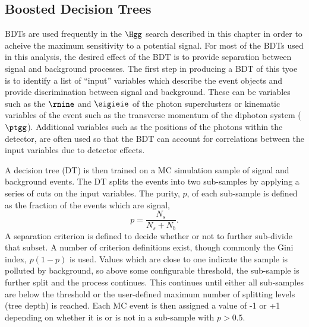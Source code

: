 \subsection{Boosted Decision Trees}
\label{sec:bdts}

BDTs are used frequently in the $\Hgg$ search described in this
chapter in order to acheive the maximum sensitivity to a potential signal.
For most of the BDTs used in this analysis, the desired effect
of the BDT is to provide separation between signal and background processes. 
The first step in producing a BDT of this tyoe is to identify a list of ``input'' 
variables which describe the event objects and provide discrimination 
between signal and background.  
These can be variables such as the $\rnine$ and $\sigieie$ 
of the photon superclusters or kinematic variables of the event such as
the transverse momentum of the diphoton system ($\ptgg$). 
Additional variables such as the positions of the photons within the detector,
are often used so that the BDT can account for correlations between the 
input variables due to detector effects.

A decision tree (DT) is then trained on a MC simulation sample of signal and background 
events. The DT splits the events into two sub-samples by applying a series of cuts
on the input variables. The purity, $p$, of each sub-sample is defined as 
the fraction of the events which are signal, 
\begin{equation}
p = \frac{N_{s}}{N_{s}+N_{b}}.
\end{equation}
A separation criterion is defined to decide whether or not to further sub-divide
that subset. A number of criterion definitions exist, though commonly the 
Gini index, $p(1-p)$ is used. Values which are close to one indicate 
the sample is polluted by background, so above some configurable threshold, 
the sub-sample is further split and the process continues. 
This continues until either all sub-samples are below the threshold or the
user-defined maximum number of splitting levels (tree depth) is reached. 
Each MC event is then assigned a value of -1 or +1 depending on whether it is
or is not in a sub-sample with $p>0.5$. 
 
